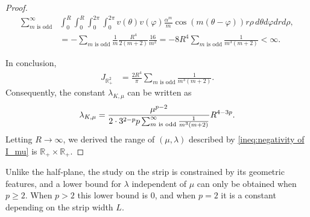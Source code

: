 \documentclass[11pt,letterpaper]{amsart}
\theoremstyle{definition}
\theoremstyle{remark}
\newcommand{\R}{\mathbb{R}}
\renewcommand{\tt}[1]{\text{#1}}
\numberwithin{equation}{section}
\begin{document}
\begin{proof}
\begin{align*}
    \sum_{m \tt{ is odd}}^\infty &  \int_{0}^{R}\int_{0}^{R}\int_{0}^{2\pi}\int_{0}^{2\pi} v(\theta)v(\varphi) \frac{\alpha^m}{m}\cos(m(\theta-\varphi))  r\rho \, d\theta d\varphi dr d\rho , \\
    & = -\sum_{m \tt{ is odd}} \frac{1}{m} \frac{R^4}{2(m+2)} \frac{16}{m^2} = -8 R^4 \sum_{m \tt{ is odd}} \frac{1}{m^3(m+2)} < \infty.
\end{align*}

In conclusion, 
\begin{align*}
    J_{\R^2_+} 
    & = \frac{2 R^4 }{\pi}\sum_{m \tt{ is odd}} \frac{1}{m^3(m+2)}.
\end{align*}
Consequently, the constant $\lambda_{K,\mu}$ can be written as
\begin{align}
    \lambda_{K,\mu}=\frac{\mu^{p-2}}{2\cdot 3^{2-p}p \sum_{m \tt{ is odd}}^\infty \frac{1}{m^3(m+2)}}R^{4-3p}. \label{eqn:reduced lambda_{mu,K} for half plane}
\end{align}
Letting $R\to \infty$, we derived the range of $(\mu,\lambda)$ described by \eqref{ineq:negativity of I_mu} is $\R_+\times \R_+$.
    
\end{proof}

Unlike the half‑plane, the study on the strip is constrained by its geometric features, and a lower bound for $\lambda$ independent of $\mu$ can only be obtained when $p\ge 2$. When $p>2$ this lower bound is $0$, and when $p=2$ it is a constant depending on the strip width $L$.
\end{document}
